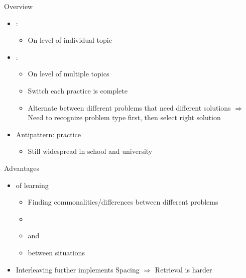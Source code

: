 \documentclass{ercisbeamer}
\begin{document}
\begin{frame}{Overview}
    \begin{tbox}
        \begin{itemize}
            \item {}: 
            \begin{itemize}
                \item On level of individual topic
            \end{itemize}
            \item {}: 
            \begin{itemize}
                \item On level of multiple topics
                \item Switch  each practice is complete
                \item Alternate between different problems that need different solutions $\Rightarrow$ Need to recognize problem type first, then select right solution
            \end{itemize}
            \item Antipattern:  practice
            \begin{itemize}
                \item Still widespread in school and university
            \end{itemize}
        \end{itemize}
    \end{tbox}
\end{frame}
\setbgimage{}

\begin{frame}{Advantages}
    \begin{itemize}
        \item {} of learning
        \begin{itemize}
            \item Finding commonalities/differences between different problems
            \item {}
            \item {} and 
            \item {} between situations
        \end{itemize}
        \item Interleaving further implements Spacing $\Rightarrow$ Retrieval is harder
    \end{itemize}
\end{frame}
\end{document}
